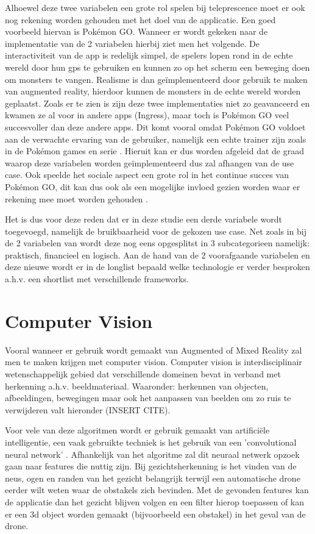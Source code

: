 Alhoewel deze twee variabelen een grote rol spelen bij teleprescence moet er ook nog rekening worden gehouden met het doel van de applicatie. Een goed voorbeeld hiervan is Pokémon GO. Wanneer er wordt gekeken naar de implementatie van de 2 variabelen hierbij ziet men het volgende. De interactiviteit van de app is redelijk simpel, de spelers lopen rond in de echte wereld door hun gps te gebruiken en kunnen zo op het scherm een beweging doen om monsters te vangen. Realisme is dan geïmplementeerd door gebruik te maken van augmented reality, hierdoor kunnen de monsters in de echte wereld worden geplaatst. Zoals er te zien is zijn deze twee implementaties niet zo geavanceerd en kwamen ze al voor in andere apps (Ingress), maar toch is Pokémon GO veel succesvoller dan deze andere apps. Dit komt vooral omdat Pokémon GO voldoet aan de verwachte ervaring van de gebruiker, namelijk een echte trainer zijn zoals in de Pokémon games en serie \autocite{Tang2017}. Hieruit kan er dus worden afgeleid dat de graad waarop deze variabelen worden geïmplementeerd dus zal afhangen van de use case. Ook speelde het sociale aspect een grote rol in het continue succes van Pokémon GO, dit kan dus ook als een mogelijke invloed gezien worden waar er rekening mee moet worden gehouden \autocite{Tang2017}.


Het is dus voor deze reden dat er in deze studie een derde variabele wordt toegevoegd, namelijk de bruikbaarheid voor de gekozen use case. Net zoals in bij de 2 variabelen van \textcite{Steuer1992} wordt deze nog eens opgesplitst in 3 subcategorieen namelijk: praktisch, financieel en logisch. Aan de hand van de 2 voorafgaande variabelen en deze nieuwe wordt er in de longlist bepaald welke technologie er verder besproken a.h.v. een shortlist met verschillende frameworks. 

\section{Computer Vision}

Vooral wanneer er gebruik wordt gemaakt van Augmented of Mixed Reality zal men te maken krijgen met computer vision. Computer vision is interdisciplinair wetenschappelijk gebied dat verschillende domeinen bevat in verband met herkenning a.h.v. beeldmateriaal. Waaronder: herkennen van objecten, afbeeldingen, bewegingen maar ook het aanpassen van beelden om zo ruis te verwijderen valt hieronder (INSERT CITE).

Voor vele van deze algoritmen wordt er gebruik gemaakt van artificiële intelligentie, een vaak gebruikte techniek is het gebruik van een 'convolutional neural network' \autocite{Ji2013}. Afhankelijk van het algoritme zal dit neuraal netwerk opzoek gaan naar features die nuttig zijn. Bij gezichtsherkenning is het vinden van de neus, ogen en randen van het gezicht belangrijk terwijl een automatische drone eerder wilt weten waar de obstakels zich bevinden. Met de gevonden features kan de applicatie dan het gezicht blijven volgen en een filter hierop toepassen of kan er een 3d object worden gemaakt (bijvoorbeeld een obstakel) in het geval van de drone. 

